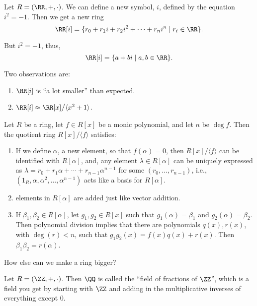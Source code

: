
\begin{exmp}
	Let $R = (\RR, +, \cdot)$. We can define a new symbol, $i$, defined by the equation $i^2 = -1$. Then we get a new ring \[\RR[i] = \{r_0 + r_1 i + r_2 i^2 + \cdots + r_ni^n \mid r_i \in \RR\}.\]

	But  $i^2 = -1$, thus, \[\RR[i] = \{a + bi \mid a, b \in \RR\}.\]

	Two observations are:
	\begin{enumerate}[label = \textbullet]
		\item $\RR[i]$ is ``a lot smaller'' than expected.
		\item $\RR[i] \approx \RR[x] \big/ \langle x^2 + 1 \rangle$.
	\end{enumerate}
\end{exmp}

\begin{prop}
	Let $R$ be a ring, let $f \in R[x]$ be a monic polynomial, and let $n$ be $\deg f$. Then the quotient ring  $R[x] / \langle f \rangle$ satisfies:
	\begin{enumerate}
		\item If we define $\alpha$, a new element, so that $f(\alpha) = 0$, then $R[x] / \langle f \rangle$ can be identified with $R[\alpha]$, and, any element $\lambda \in R[\alpha]$ can be uniquely expressed as $\lambda = r_0 + r_1\alpha + \cdots + r_{n-1}\alpha^{n-1}$ for some $(r_0, \dots, r_{n-1})$, i.e., $(1_R, \alpha, \alpha^2, \dots, \alpha^{n-1})$ acts like a basis for $R[\alpha]$.
		\item elements in  $R[\alpha]$ are added just like vector addition.
		\item If $\beta_1, \beta_2 \in R[\alpha]$, let $g_1, g_2 \in R[x]$ such that  $g_1(\alpha) = \beta_1$ and $g_2(\alpha) = \beta_2$. Then polynomial division implies that there are polynomials $q(x), r(x)$, with $\deg(r) < n$, such that $g_1g_2(x) = f(x)q(x) + r(x)$. Then $\beta_1\beta_2 = r(\alpha)$.
	\end{enumerate}
\end{prop}

How else can we make a ring bigger?

\begin{exmp}
	Let $R = (\ZZ, +, \cdot)$. Then $\QQ$ is called the ``field of fractions of $\ZZ$'', which is a field you get by starting with $\ZZ$ and adding in the multiplicative inverses of everything except $0$.
\end{exmp}

